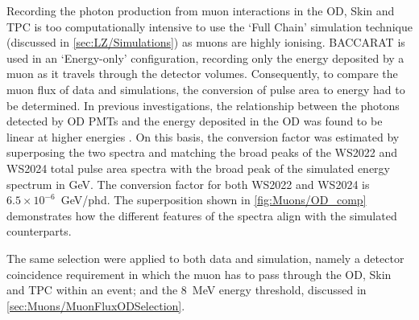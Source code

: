 Recording the photon production from muon interactions in the OD, Skin and TPC is too computationally intensive to use the `Full Chain' simulation technique (discussed in \autoref{sec:LZ/Simulations}) as muons are highly ionising. BACCARAT is used in an `Energy-only' configuration, recording only the energy deposited by a muon as it travels through the detector volumes. Consequently, to compare the muon flux of data and simulations, the conversion of pulse area to energy had to be determined. In previous investigations, the relationship between the photons detected by OD PMTs and the energy deposited in the OD was found to be linear at higher energies \cite{OD_linear}. On this basis, the conversion factor was estimated by superposing the two spectra and matching the broad peaks of the WS2022 and WS2024 total pulse area spectra with the broad peak of the simulated energy spectrum in GeV. The conversion factor for both WS2022 and WS2024 is $6.5\times10^{-6}$~GeV/phd. The superposition shown in \autoref{fig:Muons/OD_comp} demonstrates how the different features of the spectra align with the simulated counterparts.

The same selection were applied to both data and simulation, namely a detector coincidence requirement in which the muon has to pass through the OD, Skin and TPC within an event; and the 8~MeV energy threshold, discussed in \autoref{sec:Muons/MuonFluxODSelection}.

